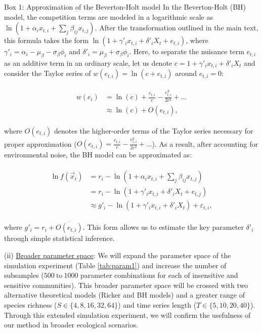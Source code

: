 \documentclass[12pt, class=article, crop=false]{standalone}
\begin{document}
\begin{tcolorbox}[{
  breakable,
  colback=white,
  colframe=gray,
  coltext=black,
  parbox=false,
  boxsep=5pt,
  arc=1pt}]
    Box 1: Approximation of the Beverton-Holt model
    \hline
    In the Beverton-Holt (BH) model, the competition terms are modeled in a logarithmic scale as $\ln(1 + \alpha_i x_{t,i} + \sum_j \beta_{ij} x_{t,j})$.
    After the transformation outlined in the main text, this formula takes the form $\ln(1 + \gamma'_i x_{t,i} + \delta'_i X_t + e_{t,i})$, where $\gamma'_i = \alpha_i - \mu_{\beta} - \sigma_{\beta} \phi_i$ and $\delta'_i = \mu_{\beta} + \sigma_{\beta} \phi_i$.
    Here, to separate the nuisance term $e_{t,i}$ as an additive term in an ordinary scale, let us denote $c = 1 + \gamma'_i x_{t,i} + \delta'_i X_t$ and consider the Taylor series of $w(e_{t,i}) = \ln(c + e_{t,i})$ around $e_{t,i} = 0$:

    \begin{align}
        \begin{split}
        \label{eq:bhtaylor}
        w(e_i) &= \ln(c) + \frac{e_{t,i}}{c} - \frac{e_{t,i}^2}{2 c^2} + ...\\
        &\approx \ln(c) + O(e_{t,i}),
        \end{split}
    \end{align}

    where $O(e_{t,i})$ denotes the higher-order terms of the Taylor series necessary for proper approximation ($O(e_{t,i}) = \frac{e_{t,i}}{c} - \frac{e_{t,i}^2}{2 c^2} + ...$). 
    As a result, after accounting for environmental noise, the BH model can be approximated as:

    \begin{align}
    \begin{split}
        \ln f(\overset{\rightarrow}{x}_{t}) 
            &= r_i - \ln(1 + \alpha_i x_{t,i} + \sum_j \beta_{ij} x_{t,j})\\
            &= r_i - \ln(1 + \gamma'_i x_{t,i} + \delta'_{i} X_t + e_{t,j})\\
            &\approx g'_{i} - \ln(1 + \gamma'_i x_{t,i} + \delta'_i X_t) + \varepsilon_{t,i},
    \end{split}
    \end{align}

    where $g'_{i} = r_i + \overline{O(e_{t,i})}$.
    This form allows us to estimate the key parameter $\delta'_i$ through simple statistical inference.
\end{tcolorbox}

(ii) \ul{Broader parameter space}: We will expand the parameter space of the simulation experiment (Table \ref{tab:param1}) and increase the number of subsamples ($500~\mbox{to}~1000$ parameter combinations for each of insensitive and sensitive communities).
This broader parameter space will be crossed with two alternative theoretical models (Ricker and BH models) and a greater range of species richness ($S \in \{4, 8, 16, 32, 64\}$) and time series length ($T \in \{5, 10, 20, 40\}$).
Through this extended simulation experiment, we will confirm the usefulness of our method in broader ecological scenarios.
\end{document}
